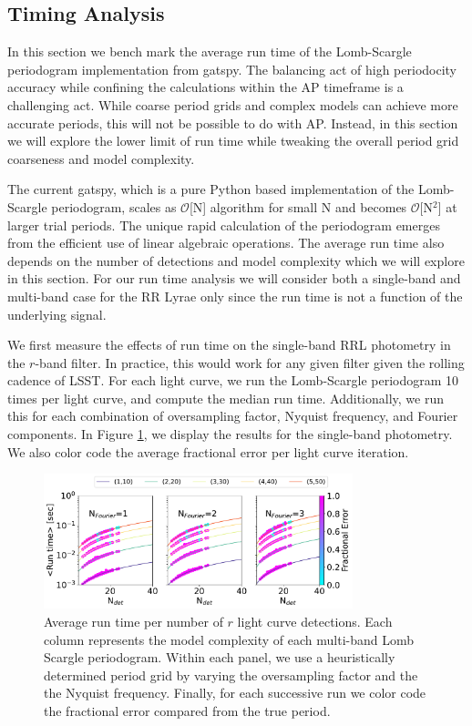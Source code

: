 \documentclass[DM,authoryear,toc]{lsstdoc}
\begin{document}
\subsection{Timing Analysis}

In this section we bench mark the average run time of the Lomb-Scargle periodogram implementation from gatspy. The balancing act of high periodocity accuracy while confining the calculations within the AP timeframe is a challenging act. While coarse period grids  and complex models can achieve more accurate periods, this will not be possible to do with AP. Instead, in this section we will explore the lower limit of run time while tweaking the overall period grid coarseness and model complexity.

The current gatspy, which is a pure Python based implementation of the Lomb-Scargle periodogram, scales as  $\mathcal{O}$[N] algorithm for small N and becomes $\mathcal{O}$[N$^2$] at larger trial periods. The unique rapid calculation of the periodogram emerges from the efficient use of linear algebraic operations. The average run time also depends on the number of detections and model complexity which we will explore in this section. For our run time analysis we will consider both a single-band and multi-band case for the RR Lyrae only since the run time is not a function of the underlying signal. 

We first measure the effects of run time on the single-band RRL photometry in the $r$-band filter. In practice, this would work for any given filter given the rolling cadence of LSST. For each light curve, we run the Lomb-Scargle periodogram 10 times per light curve, and compute the median run time. Additionally, we run this for each combination of oversampling factor, Nyquist frequency, and Fourier components. In Figure \ref{fig:run_time_single}, we display the results for the single-band photometry. We also color code the average fractional error per light curve iteration. 


 
 \begin{figure}
  \includegraphics[width=0.8\textwidth]{figures/singleRUN_LSP_RRL.pdf}
  \centering 
  \caption{Average run time per number of $r$ light curve detections. Each column represents the model complexity of each multi-band Lomb Scargle periodogram. Within each panel, we use a heuristically determined period grid by varying the oversampling factor and the the Nyquist frequency.  Finally, for each successive run we color code the fractional error compared from the true period.}
  \label{fig:run_time_single}
\end{figure}
\end{document}
